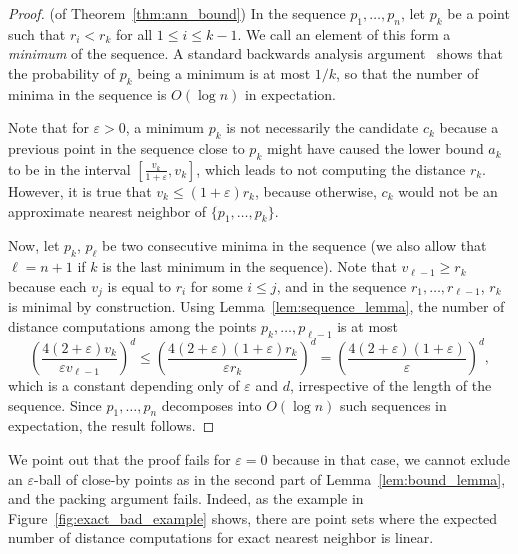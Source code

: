 \documentclass[a4paper,USenglish]{socg-lipics-v2018}
\newcommand{\eps}{\varepsilon}
\begin{document}
\begin{proof} (of Theorem~\ref{thm:ann_bound})
%
In the sequence $p_1,\ldots,p_n$, let $p_k$ be a point 
such that $r_i<r_k$ for all $1\leq i\leq k-1$. We call an element
of this form a \emph{minimum} of the sequence. 
A standard backwards analysis argument~\cite{seidel-backwards} shows that the probability
of $p_k$ being a minimum is at most $1/k$, so that the number of minima
in the sequence is $O(\log n)$ in expectation.

Note that for $\eps>0$,
a minimum $p_k$ is not necessarily the candidate $c_k$ because a previous point
in the sequence close to $p_k$ might have caused the lower bound $a_k$ to be
in the interval $[\frac{v_k}{1+\eps},v_k]$, which leads to not
computing the distance $r_k$. However, it is true that
$v_k\leq (1+\eps)r_k$, because otherwise, $c_k$ would not be an approximate
nearest neighbor of $\{p_1,\ldots,p_k\}$.

Now, let $p_k$, $p_\ell$ be two consecutive minima in the sequence
(we also allow that $\ell=n+1$ if $k$ is the last minimum in the sequence).
Note that $v_{\ell-1}\geq r_k$ because each $v_j$ is equal to $r_i$ for
some $i\leq j$, and in the sequence $r_1,\ldots,r_{\ell-1}$, $r_k$
is minimal by construction. Using Lemma~\ref{lem:sequence_lemma},
the number of distance computations among the points
$p_k,\ldots,p_{\ell-1}$ is at most
\[
\left(\frac{4(2+\eps) v_k}{\eps v_{\ell-1}}\right)^{d}\leq \left(\frac{4(2+\eps)(1+\eps)r_k}{\eps r_k}\right)^{d}=\left(\frac{4(2+\eps)(1+\eps)}{\eps}\right)^{d},\]
which is a constant depending only of $\eps$ and $d$, irrespective of the length of the sequence.
Since $p_1,\ldots,p_n$ decomposes into $O(\log n)$ such sequences in expectation, the result follows.
\end{proof}

We point out that the proof fails for $\eps=0$ because in that case, we cannot exlude an $\eps$-ball
of close-by points as in the second part of Lemma~\ref{lem:bound_lemma}, and the packing argument fails.
Indeed, as the example in Figure~\ref{fig:exact_bad_example} shows, there are point sets where the expected number
of distance computations for exact nearest neighbor is linear.
\end{document}
